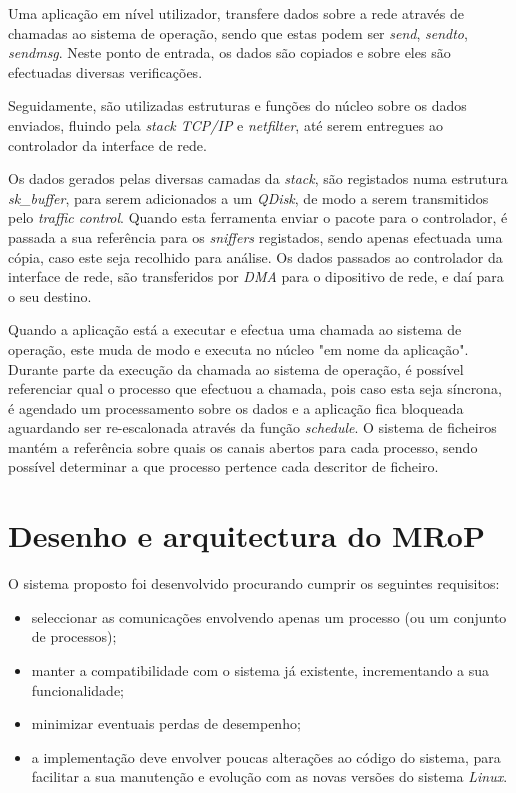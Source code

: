 Uma aplicação em nível utilizador, transfere dados sobre a rede através de chamadas ao sistema de operação, sendo que estas podem ser \textit{send}, \textit{sendto}, \textit{sendmsg}.
Neste ponto de entrada, os dados são copiados e sobre eles são efectuadas diversas verificações.

Seguidamente, são utilizadas estruturas e funções do núcleo sobre os dados enviados, fluindo pela \textit{stack TCP/IP} e \textit{netfilter}, até serem entregues ao controlador da interface de rede.

Os dados gerados pelas diversas camadas da \textit{stack}, são registados numa estrutura \textit{sk\_buffer}, para serem adicionados a um \textit{QDisk}, de modo a serem transmitidos pelo \textit{traffic control}.
Quando esta ferramenta enviar o pacote para o controlador, é passada a sua referência para os \textit{sniffers} registados, sendo apenas efectuada uma cópia, caso este seja recolhido para análise.
Os dados passados ao controlador da interface de rede, são transferidos por \textit{DMA} para o dipositivo de rede, e daí para o seu destino.

Quando a aplicação está a executar e efectua uma chamada ao sistema de operação, este muda de modo e executa no núcleo \color{red}"em nome da aplicação"\color{black}.
Durante parte da execução da chamada ao sistema de operação, é possível referenciar qual o processo que efectuou a chamada, pois caso esta seja síncrona, é agendado um processamento sobre os dados e a aplicação fica bloqueada aguardando ser re-escalonada através da função \textit{schedule}.
O sistema de ficheiros mantém a referência sobre quais os canais abertos para cada processo, sendo possível determinar a que processo pertence cada descritor de ficheiro.%

\section{Desenho e arquitectura do MRoP}
\label{sec:mrop_architecture}

O sistema proposto foi desenvolvido procurando cumprir os seguintes requisitos:
\begin{itemize}
\item seleccionar as comunicações envolvendo apenas um processo (ou um conjunto de processos);
\item manter a compatibilidade com o sistema já existente, incrementando a sua funcionalidade;
\item minimizar eventuais perdas de desempenho;
\item a implementação deve envolver poucas alterações ao código do sistema, para facilitar a sua manutenção e evolução com as novas versões do sistema \textit{Linux}.
\end{itemize}

